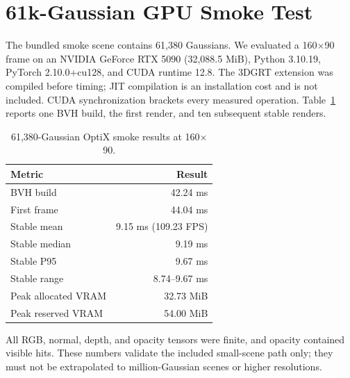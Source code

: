 \section{61k-Gaussian GPU Smoke Test}
The bundled smoke scene contains 61,380 Gaussians. We evaluated a 160$\times$90
frame on an NVIDIA GeForce RTX 5090 (32,088.5 MiB), Python 3.10.19,
PyTorch 2.10.0+cu128, and CUDA runtime 12.8. The 3DGRT extension was compiled
before timing; JIT compilation is an installation cost and is not included.
CUDA synchronization brackets every measured operation. Table~\ref{tab:gpu}
reports one BVH build, the first render, and ten subsequent stable renders.

\begin{table}[h]
\centering
\caption{61,380-Gaussian OptiX smoke results at 160$\times$90.}
\label{tab:gpu}
\begin{tabular}{lr}
\toprule
Metric & Result\\
\midrule
BVH build & 42.24 ms\\
First frame & 44.04 ms\\
Stable mean & 9.15 ms (109.23 FPS)\\
Stable median & 9.19 ms\\
Stable P95 & 9.67 ms\\
Stable range & 8.74--9.67 ms\\
Peak allocated VRAM & 32.73 MiB\\
Peak reserved VRAM & 54.00 MiB\\
\bottomrule
\end{tabular}
\end{table}
All RGB, normal, depth, and opacity tensors were finite, and opacity contained
visible hits. These numbers validate the included small-scene path only; they
must not be extrapolated to million-Gaussian scenes or higher resolutions.
